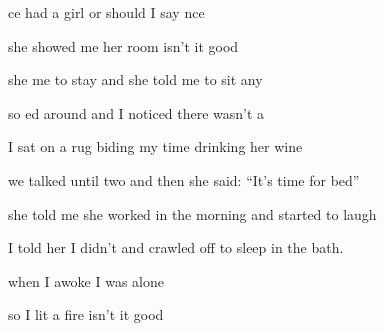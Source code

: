 
\zs
{}ce had a girl or should I say nce  

she showed me her room isn't it good  

she  me to stay and she told me to sit any

so ed around and I noticed there wasn't a  
\ks

\zs
I sat on a rug biding my time drinking her wine

we talked until two and then she said: ``It's time for bed''

she told me she worked in the morning and started to laugh

I told her I didn't and crawled off to sleep in the bath.
\ks

\zr
{} when I awoke I was alone   

so I lit a fire isn't it good  
\kr

\kp





